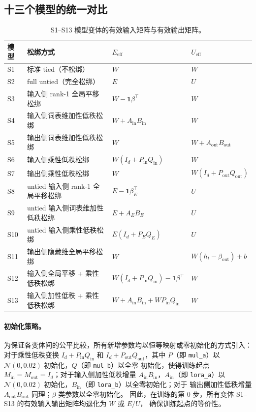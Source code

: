 \subsection{十三个模型的统一对比}

\begin{table}[htbp]
\centering
\caption{S1--S13 模型变体的有效输入矩阵与有效输出矩阵。}
\label{tab:s1_s13_variants}
\begin{tabular}{llll}
\toprule
模型 & 松绑方式 & $E_{\mathrm{eff}}$ & $U_{\mathrm{eff}}$ \\
\midrule
S1 & 标准 tied（不松绑） & $W$ & $W$ \\
S2 & full untied（完全松绑） & $E$ & $U$ \\
S3 & 输入侧 rank-1 全局平移松绑 & $W-\mathbf{1}\beta^\top$ & $W$ \\
S4 & 输入侧词表维加性低秩松绑 & $W+A_{\mathrm{in}}B_{\mathrm{in}}$ & $W$ \\
S5 & 输出侧词表维加性低秩松绑 & $W$ & $W+A_{\mathrm{out}}B_{\mathrm{out}}$ \\
S6 & 输入侧乘性低秩松绑 & $W(I_d+P_{\mathrm{in}}Q_{\mathrm{in}})$ & $W$ \\
S7 & 输出侧乘性低秩松绑 & $W$ & $W(I_d+P_{\mathrm{out}}Q_{\mathrm{out}})$ \\
S8 & untied 输入侧 rank-1 全局平移松绑 & $E-\mathbf{1}\beta_E^\top$ & $U$ \\
S9 & untied 输入侧词表维加性低秩松绑 & $E+A_EB_E$ & $U$ \\
S10 & untied 输入侧乘性低秩松绑 & $E(I_d+P_EQ_E)$ & $U$ \\
S11 & 输出侧隐藏维全局平移松绑 & $W$ & $W(h_t-\beta_{\mathrm{out}})+b$ \\
S12 & 输入侧全局平移 + 乘性低秩松绑 & $W(I_d+P_{\mathrm{in}}Q_{\mathrm{in}})-\mathbf{1}\beta^\top$ & $W$ \\
S13 & 输入侧加性低秩 + 乘性低秩松绑 & $W+A_{\mathrm{in}}B_{\mathrm{in}}+WP_{\mathrm{in}}Q_{\mathrm{in}}$ & $W$ \\
\bottomrule
\end{tabular}
\end{table}

\paragraph{初始化策略。}
为保证各变体间的公平比较，所有新增参数均以恒等映射或零初始化的方式引入：对于乘性低秩变换
$I_d+P_{\mathrm{in}}Q_{\mathrm{in}}$ 和 $I_d+P_{\mathrm{out}}Q_{\mathrm{out}}$，其中
$P$（即 \texttt{mul\_a}）以 $\mathcal{N}(0,0.02)$ 初始化，$Q$（即 \texttt{mul\_b}）以全零
初始化，使得训练起点 $M_{\mathrm{in}}=M_{\mathrm{out}}=I_d$；对于输入侧加性低秩增量
$A_{\mathrm{in}}B_{\mathrm{in}}$，$A_{\mathrm{in}}$（即 \texttt{lora\_a}）以
$\mathcal{N}(0,0.02)$ 初始化，$B_{\mathrm{in}}$（即 \texttt{lora\_b}）以全零初始化；对于
输出侧加性低秩增量 $A_{\mathrm{out}}B_{\mathrm{out}}$ 同理；$\beta$ 类参数以全零初始化。
因此，在训练的第 0 步，所有变体 S1--S13 的有效输入输出矩阵均退化为 $W$ 或 $E/U$，
确保训练起点的等价性。

